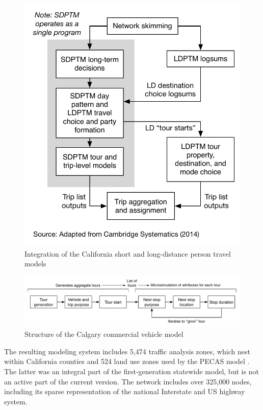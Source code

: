 \begin{figure}  %
\centering
\includegraphics[scale=0.6]{graphics/54-sdptm-ldptm-integration}
\caption{Integration of the California short and long-distance person travel models}
\label{fig:california-interactions}
\end{figure}

\begin{figure}   %
\centering
\includegraphics[width=6in]{graphics/55-calgary-model}
\caption{Structure of the Calgary commercial vehicle model}
\label{fig:calgary-model}
\end{figure}

The resulting modeling system includes 5,474 traffic analysis zones, which nest within California counties and 524 land use zones used by the PECAS model \citep{hunt05}. The latter was an integral part of the first-generation statewide model, but is not an active part of the current version. The network includes over 325,000 nodes, including its sparse representation of the national Interstate and US highway system.

